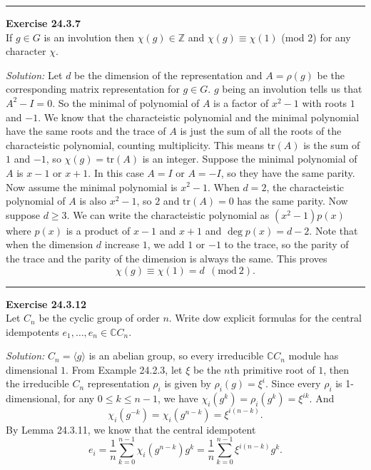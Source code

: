 \documentclass[a4paper, 12pt]{article}
\newenvironment{problem}[2][Exercise]
    { \begin{mdframed}[backgroundcolor=gray!20] \textbf{#1 #2} \\}
    {  \end{mdframed}}
\newenvironment{solution}
    {\textit{Solution:}}
    {}
\newcommand{\la}{\langle}
\newcommand{\ra}{\rangle}
\newcommand{\tr}{\text{tr}}
\begin{document}
\noindent\rule{7in}{2.8pt}
\begin{problem}{24.3.7}
If \(g\in G\) is an involution then \(\chi(g)\in \mathbb{Z}\) and \(\chi(g)\equiv \chi(1)\) (mod 2) for any character \(\chi\).
\end{problem}
\begin{solution}
Let \(d\) be the dimension of the representation and \(A=\rho(g)\) be the corresponding matrix representation for \(g\in G\). \(g\) being an involution tells us that 
\(A^2-I=0\). So the minimal of polynomial of \(A\) is a factor of \(x^2-1\) with roots \(1\) and \(-1\). We know that the characteistic polynomial and the minimal polynomial have the same roots and the trace of 
\(A\) is just the sum of all the roots of the characteistic polynomial, counting multiplicity. This means \(\tr(A)\) is the sum of \(1\) and \(-1\), so \(\chi(g)=\tr(A)\) is an integer. Suppose the minimal polynomial of \(A\) is 
\(x-1\) or \(x+1\). In this case \(A=I\) or \(A=-I\), so they have the same parity. Now assume the minimal polynomial is \(x^2-1\). When \(d=2\), the characteistic polynomial of \(A\) is also \(x^2-1\), so \(2\) and \(\tr(A)=0\) has the same parity. Now suppose \(d\geq 3\). We can 
write the characteistic polynomial as \((x^2-1)p(x)\) where \(p(x)\) is a product of \(x-1\) and \(x+1\) and \(\deg p(x)=d-2\). Note that when the dimension \(d\) increase \(1\), we add \(1\) or \(-1\) to the trace, so the 
parity of the trace and the parity of the dimension is always the same. This proves 
\[\chi(g)\equiv \chi(1)=d\ \  (\text{mod}\  2).\] 
\end{solution}

\noindent\rule{7in}{2.8pt}
\begin{problem}{24.3.12}
Let \(C_n\) be the cyclic group of order \(n\). Write dow explicit formulas for the central idempotents \(e_1,\ldots,e_n\in \mathbb{C}C_n\).
\end{problem}
\begin{solution}
\(C_n=\la g\ra\) is an abelian group, so every irreducible \(\mathbb{C}C_n\) module has dimensional \(1\). From Example 24.2.3, let \(\xi\) be the \(n\)th primitive root of \(1\), then the irreducible 
\(C_n\) representation \(\rho_i\) is given by \(\rho_i(g)=\xi^i\). Since every \(\rho_i\) is 1-dimensional, for any \(0\leq k\leq n-1\), we have \(\chi_i(g^k)=\rho_i(g^k)=\xi^{ik}\). And 
\[\chi_i(g^{-k})=\chi_i(g^{n-k})=\xi^{i(n-k)}.\]
By Lemma 24.3.11, we know that the central idempotent 
\[e_i=\frac{1}{n}\sum_{k=0}^{n-1} \chi_i(g^{n-k})g^k=\frac{1}{n}\sum_{k=0}^{n-1}\xi^{i(n-k)}g^k.\] 	
\end{solution}
\end{document}
